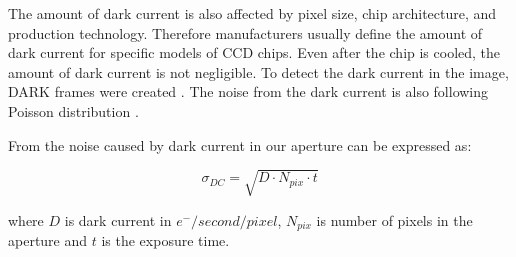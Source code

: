     The amount of dark current is also affected by pixel size, chip architecture, and production technology. Therefore manufacturers usually define the amount of dark current for specific models of CCD chips.
    Even after the chip is cooled, the amount of dark current is not negligible. To detect the dark current in the image, DARK frames were created \cite{articleCcdOnline}. The noise from the dark current is also following Poisson distribution \cite{matfyzpress01}. 
    
    From \cite{bolte15} the noise caused by dark current in our aperture can be expressed as:
    
    \begin{equation}
    \label{eqn:darkcurrent}
        \sigma_{DC} = \sqrt{D \cdot N_{pix} \cdot t}
    \end{equation}

    
    where $D$ is dark current in $e^-/second/pixel$, $N_{pix}$ is number of pixels in the aperture and $t$ is the exposure time.
    
